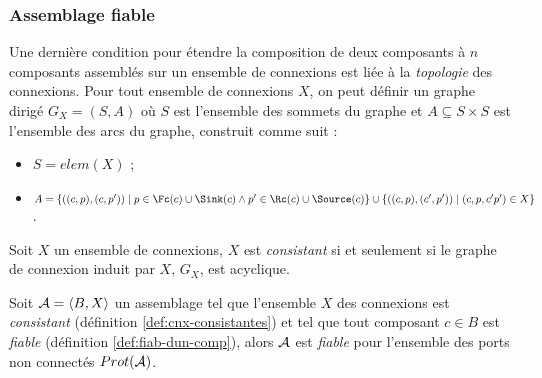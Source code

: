 \subsubsection{Assemblage fiable}

Une derni\`ere condition pour \'etendre la composition de deux
composants \`a $n$ composants assembl\'es sur un ensemble de
connexions est li\'ee \`a la \emph{topologie } des connexions. 
Pour tout ensemble de connexions $X$, on peut d\'efinir un graphe dirig\'e
$G_X=(S,A)$ o\`u $S$ est l'ensemble des sommets du graphe et $A\subseteq
S\times{}S$ est l'ensemble des arcs du graphe, construit comme suit :
\begin{itemize}
  \item $S = elem(X)$ ;
  \item $A = \{ ((c,p),(c,p')) \mid p\in \Fc(c)\cup\Sink(c)\wedge
  p'\in \Rc(c) \cup \Source(c)\} \cup \{ ((c,p),(c',p')) \mid
  (c,p,c'p')\in X\}$.
\end{itemize}

\begin{definition}
\label{def:cnx-consistantes}
Soit $X$ un ensemble de connexions, $X$ est \emph{consistant} si et
seulement si le graphe de connexion induit par $X$, $G_X$, est acyclique.
\end{definition}

\begin{theoreme}[Compositionnalit\'e]
\label{th:compositionnalite}
    Soit ${\cal A} = \langle B,X \rangle$ un assemblage tel que
    l'ensemble $X$ des connexions est \emph{consistant} (d\'efinition
    \ref{def:cnx-consistantes}) et tel que tout composant $c\in B$ est
    \emph{fiable} (d\'efinition \ref{def:fiab-dun-comp}),
    alors ${\cal A}$ est \emph{fiable} pour l'ensemble des ports non
    connect\'es $Prot({\cal A})$.
\end{theoreme}

